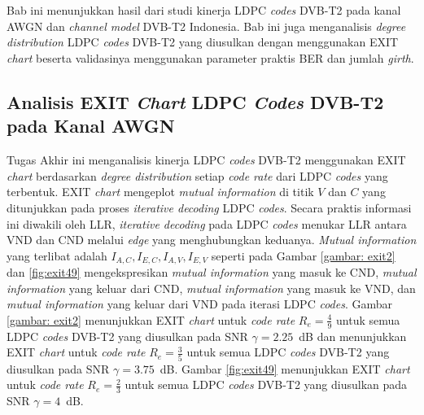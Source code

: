 \chapter{\babEmpat}
Bab ini menunjukkan hasil dari studi kinerja LDPC \textit{codes} DVB-T2 pada kanal AWGN dan \textit{channel model} DVB-T2 Indonesia. Bab ini juga menganalisis \textit{degree distribution} LDPC \textit{codes} DVB-T2 yang diusulkan dengan menggunakan EXIT \textit{chart} beserta validasinya menggunakan parameter praktis BER dan jumlah \textit{girth}.



\section{Analisis EXIT \textit{Chart} LDPC \textit{Codes} DVB-T2 pada Kanal AWGN}

Tugas Akhir ini menganalisis kinerja LDPC \textit{codes} DVB-T2 menggunakan EXIT \textit{chart} berdasarkan \textit{degree distribution} setiap \textit{code rate} dari LDPC \textit{codes} yang terbentuk. EXIT \textit{chart} mengeplot \textit{mutual information} di titik $V$ dan $C$ yang ditunjukkan pada proses \textit{iterative decoding} LDPC \textit{codes}. Secara praktis informasi ini diwakili oleh LLR, \textit{iterative decoding} pada LDPC \textit{codes} menukar LLR antara VND dan CND melalui \textit{edge} yang menghubungkan keduanya. \textit{Mutual information} yang terlibat adalah $ I_ {A, C} , I_ {E, C} , I_ {A, V} , I_ {E, V} $ seperti pada Gambar \ref{gambar: exit2} dan \ref{fig:exit49} mengekspresikan \textit{mutual information} yang masuk ke CND, \textit{mutual information} yang keluar dari CND, \textit{mutual information} yang masuk ke VND, dan \textit{mutual information} yang keluar dari VND pada iterasi LDPC \textit{codes}. Gambar \ref{gambar: exit2} menunjukkan EXIT \textit{chart} untuk \textit{code rate} $R_e=\frac{4}{9}$ untuk semua LDPC \textit{codes} DVB-T2 yang diusulkan pada SNR $\gamma=2.25$~dB dan menunjukkan EXIT \textit{chart} untuk \textit{code rate} $R_e=\frac{3}{5}$ untuk semua LDPC \textit{codes} DVB-T2 yang diusulkan pada SNR $\gamma=3.75$~dB. Gambar \ref{fig:exit49} menunjukkan EXIT \textit{chart} untuk \textit{code rate} $R_e=\frac{2}{3}$ untuk semua LDPC \textit{codes} DVB-T2 yang diusulkan pada SNR $\gamma=4$~dB.



